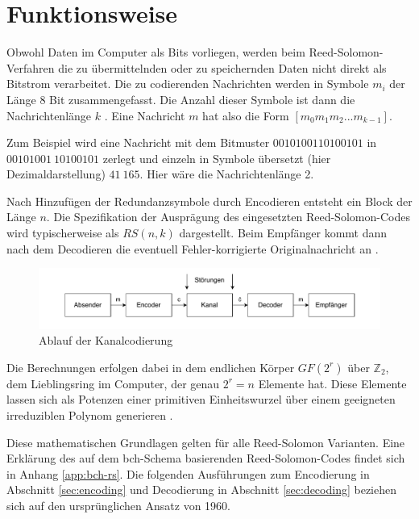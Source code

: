 \chapter{Funktionsweise}\label{ch:operatingPrinciple}

Obwohl Daten im Computer als Bits vorliegen, werden beim Reed-Solomon-Verfahren die zu übermittelnden oder zu speichernden Daten nicht direkt als Bitstrom verarbeitet.
Die zu codierenden Nachrichten werden in Symbole $m_{i}$ der Länge 8 Bit zusammengefasst.
Die Anzahl dieser Symbole ist dann die Nachrichtenlänge $k$ \cite{rileyReedSolomonCodes}.
Eine Nachricht $m$ hat also die Form $[m_{0}m_{1}m_{2}...m_{k-1}]$.

Zum Beispiel wird eine Nachricht mit dem Bitmuster $0010100110100101$ in $00101001\ 10100101$ zerlegt und einzeln in Symbole übersetzt (hier Dezimaldarstellung) $41\ 165$. Hier wäre die Nachrichtenlänge 2.

Nach Hinzufügen der Redundanzsymbole durch Encodieren entsteht ein Block der Länge $n$.
Die Spezifikation der Ausprägung des eingesetzten Reed-Solomon-Codes wird typischerweise als $RS(n, k)$ dargestellt.
Beim Empfänger kommt dann nach dem Decodieren die eventuell Fehler-korrigierte Originalnachricht an \cite{hubertPracticalReedSolomonProgrammers2021}.

\begin{figure}[h]
	\centering
	\includegraphics[width=1\textwidth]{figures/Kanalcodierung.drawio.pdf}
	\caption{Ablauf der Kanalcodierung}
	\label{fig:channelcoding}
\end{figure}

Die Berechnungen erfolgen dabei in dem endlichen Körper $GF(2^r)$ über $\mathbb{Z}_2$, dem Lieblingsring im Computer, der genau $2^r=n$ Elemente hat.
Diese Elemente lassen sich als Potenzen einer primitiven Einheitswurzel über einem geeigneten irreduziblen Polynom generieren \cite{weitzKonkreteMathematikNicht2021}.

Diese mathematischen Grundlagen gelten für alle Reed-Solomon Varianten. 
Eine Erklärung des auf dem \acrshort{bch}-Schema basierenden Reed-Solomon-Codes findet sich in Anhang \ref{app:bch-rs}.
Die folgenden Ausführungen zum Encodierung in Abschnitt \ref{sec:encoding} und Decodierung in Abschnitt \ref{sec:decoding} beziehen sich auf den ursprünglichen Ansatz von 1960.


